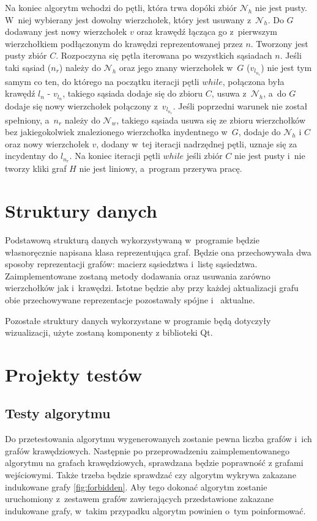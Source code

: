 \documentclass{article}
\begin{document}
Na koniec algorytm wchodzi do pętli, która trwa dopóki zbiór $\mathcal{N}_h$ nie jest pusty. W~niej wybierany jest dowolny wierzchołek, który jest usuwany z~$\mathcal{N}_h$. Do $G$ dodawany jest nowy wierzchołek $v$ oraz krawędź łącząca go z~pierwszym wierzchołkiem podłączonym do krawędzi reprezentowanej przez $n$. Tworzony jest pusty zbiór $C$. Rozpoczyna się pętla iterowana po wszystkich sąsiadach $n$. Jeśli taki sąsiad ($n_r$) należy do $\mathcal{N}_h$ oraz jego znany wierzchołek w~$G$ ($v_{l_{n_r}}$) nie jest tym samym co ten, do którego na początku iteracji pętli $while$, połączona była krawędź $l_{n}$ - $v_{l_{n}}$, takiego sąsiada dodaje się do zbioru $C$, usuwa z~$\mathcal{N}_h$, a~do $G$ dodaje się nowy wierzchołek połączony z~$v_{l_{n_r}}$. Jeśli poprzedni warunek nie został spełniony, a~$n_r$ należy do $\mathcal{N}_w$, takiego sąsiada usuwa się ze zbioru wierzchołków bez jakiegokolwiek znalezionego wierzchołka inydentnego w~$G$, dodaje do $\mathcal{N}_h$ i $C$ oraz nowy wierzchołek $v$, dodany w~tej iteracji nadrzędnej pętli, uznaje się za incydentny do $l_{n_r}$. Na koniec iteracji pętli $while$ jeśli zbiór $C$ nie jest pusty i~nie tworzy kliki graf $H$ nie jest liniowy, a~program przerywa pracę.


\section{Struktury danych}

Podstawową strukturą danych wykorzystywaną w~programie będzie własnoręcznie napisana klasa reprezentująca graf. Będzie ona przechowywała dwa sposoby reprezentacji grafów: macierz sąsiedztwa i~listę sąsiedztwa. Zaimplementowane zostaną metody dodawania oraz usuwania zarówno wierzchołków jak i~krawędzi. Istotne będzie aby przy każdej aktualizacji grafu obie przechowywane reprezentacje pozostawały spójne i~ aktualne.

Pozostałe struktury danych wykorzystane w programie będą dotyczyły wizualizacji, użyte zostaną komponenty z biblioteki Qt.

\section{Projekty testów}

\subsection{Testy algorytmu}

Do przetestowania algorytmu wygenerowanych zostanie pewna liczba grafów i~ich grafów krawędziowych. Następnie po przeprowadzeniu zaimplementowanego algorytmu na grafach krawędziowych, sprawdzana będzie poprawność z grafami wejściowymi. Także trzeba będzie sprawdzać czy algorytm wykrywa zakazane indukowane grafy \ref{fig:forbidden}. Aby tego dokonać algorytm zostanie uruchomiony z~zestawem grafów zawierających przedstawione zakazane indukowane grafy, w~takim przypadku algorytm powinien o~tym poinformować.
\end{document}
